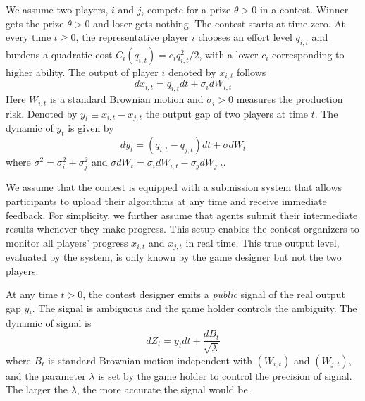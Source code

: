 \documentclass[a4paper, 11pt]{article}
\theoremstyle{plain} %
\begin{document}
We assume two players, $i$ and $j$, compete for a prize $\theta>0$ in a contest. 
Winner gets the prize $\theta>0$ and loser gets nothing. 
The contest starts at time zero. 
At every time $t\ge0$, the representative player $i$ chooses an effort level $q_{i,t}$ and burdens a quadratic cost $C_i(q_{i,t}) = c_i q_{i,t}^2/2$, with a lower $c_i$ corresponding to higher ability. 
The output of player $i$ denoted by $x_{i,t}$ follows 
\begin{equation}\label{output-process}
dx_{i,t} = q_{i,t} dt + \sigma_idW_{i,t} 
\end{equation}
Here $W_{i,t}$ is a standard Brownian motion and $\sigma_i>0$ measures the production risk. 
Denoted by $y_t \equiv x_{i,t} - x_{j,t}$ the output gap of two players at time $t$.
The dynamic of $y_t$ is given by 
\begin{equation}
	dy_t = (q_{i,t}-q_{j,t})dt + \sigma dW_t
\end{equation}
where $\sigma^2 = \sigma^2_i + \sigma_j^2$ and $\sigma dW_t = \sigma_idW_{i,t}-\sigma_jdW_{j,t}$. 

We assume that the contest is equipped with a submission system that allows participants to upload their algorithms at any time and receive immediate feedback. 
For simplicity, we further assume that agents submit their intermediate results whenever they make progress. 
This setup enables the contest organizers to monitor all players’ progress $x_{i,t}$ and $x_{j,t}$ in real time.
This true output level, evaluated by the system, is only known by the game designer but not the two players. 

At any time $t>0$, the contest designer emits a \emph{public} signal of the real output gap $y_t$. 
The signal is ambiguous and the game holder controls the ambiguity. 
The dynamic of signal is  
\begin{equation}\label{signal}
	dZ_{t} = y_{t}dt + \frac{dB_{t}}{\sqrt{\lambda}} 
\end{equation}
where $B_{t}$ is standard Brownian motion independent with $(W_{i,t})$ and $(W_{j,t})$, and the parameter $\lambda$ is set by the game holder to control the precision of signal. 
The larger the $\lambda$, the more accurate the signal would be. 
\end{document}
